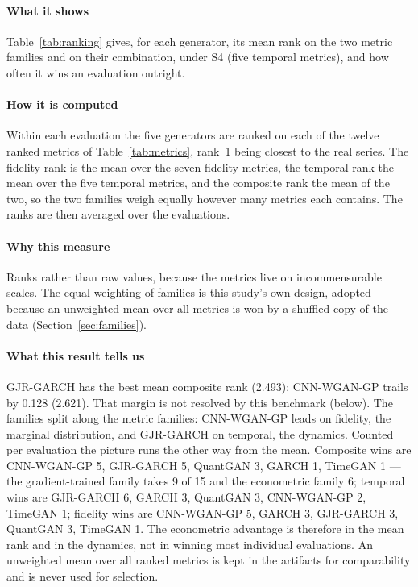\documentclass[11pt,a4paper]{article}
\makeatletter
\DeclareRobustCommand{\_}{\ifmmode\nfss@text{\textunderscore}\else\textunderscore\allowbreak\fi}
\makeatother
\begin{document}
\paragraph{What it shows} Table~\ref{tab:ranking} gives, for each generator, its mean rank on the two metric families and on their combination, under S4 (five temporal metrics), and how often it wins an evaluation outright.

\paragraph{How it is computed} Within each evaluation the five generators are ranked on each of the twelve ranked metrics of Table~\ref{tab:metrics}, rank~1 being closest to the real series. The fidelity rank is the mean over the seven fidelity metrics, the temporal rank the mean over the five temporal metrics, and the composite rank the mean of the two, so the two families weigh equally however many metrics each contains. The ranks are then averaged over the evaluations.

\paragraph{Why this measure} Ranks rather than raw values, because the metrics live on incommensurable scales. The equal weighting of families is this study's own design, adopted because an unweighted mean over all metrics is won by a shuffled copy of the data (Section~\ref{sec:families}).

\paragraph{What this result tells us} GJR-GARCH has the best mean composite rank (2.493); CNN-WGAN-GP trails by 0.128 (2.621). That margin is not resolved by this benchmark (below). The families split along the metric families: CNN-WGAN-GP leads on fidelity, the marginal distribution, and GJR-GARCH on temporal, the dynamics. Counted per evaluation the picture runs the other way from the mean. Composite wins are CNN-WGAN-GP 5, GJR-GARCH 5, QuantGAN 3, GARCH 1, TimeGAN 1 --- the gradient-trained family takes 9 of 15 and the econometric family 6; temporal wins are GJR-GARCH 6, GARCH 3, QuantGAN 3, CNN-WGAN-GP 2, TimeGAN 1; fidelity wins are CNN-WGAN-GP 5, GARCH 3, GJR-GARCH 3, QuantGAN 3, TimeGAN 1. The econometric advantage is therefore in the mean rank and in the dynamics, not in winning most individual evaluations. An unweighted mean over all ranked metrics is kept in the artifacts for comparability and is never used for selection.
\end{document}
